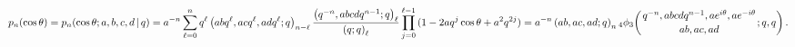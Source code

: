 \[p_{n}(\mathop{\cos\/}\nolimits\theta)=\mathop{p_{n}\/}\nolimits\!\left(\mathop%
{\cos\/}\nolimits\theta;a,b,c,d\,|\,q\right)=a^{-n}\sum_{\ell=0}^{n}q^{\ell}%
\left(abq^{\ell},acq^{\ell},adq^{\ell};q\right)_{n-\ell}\*\frac{\left(q^{-n},%
abcdq^{n-1};q\right)_{\ell}}{\left(q;q\right)_{\ell}}\prod_{j=0}^{\ell-1}{(1-2%
aq^{j}\mathop{\cos\/}\nolimits\theta+a^{2}q^{2j})}=a^{-n}\left(ab,ac,ad;q%
\right)_{n}\*\mathop{{{}_{4}\phi_{3}}\/}\nolimits\!\left({q^{-n},abcdq^{n-1},%
ae^{i\theta},ae^{-i\theta}\atop ab,ac,ad};q,q\right).\]